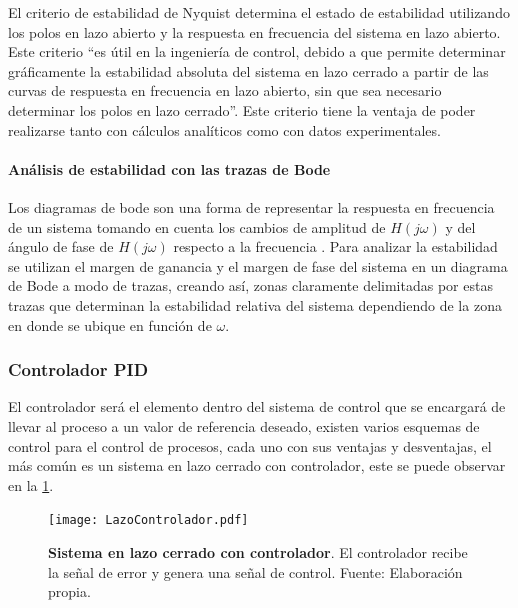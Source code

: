 				El criterio de estabilidad de Nyquist determina el estado de estabilidad utilizando los polos en lazo abierto y la respuesta en frecuencia del sistema en lazo abierto. Este criterio \enquote{es útil en la ingeniería de control, debido a que permite determinar gráficamente la estabilidad absoluta del sistema en lazo cerrado a partir de las curvas de respuesta en frecuencia en lazo abierto, sin que sea necesario determinar los polos en lazo cerrado}\Parencite[p.$\,$446]{ogata2003ingenieria}. Este criterio tiene la ventaja de poder realizarse tanto con cálculos analíticos como con datos experimentales.
			
			\paragraph{Análisis de estabilidad con las trazas de Bode}

				Los diagramas de bode son una forma de representar la respuesta en frecuencia de un sistema tomando en cuenta los cambios de amplitud de $H(j\omega)$ y del ángulo de fase de $H(j\omega)$ respecto a la frecuencia \Parencite{nilsson1995circuitos}. Para analizar la estabilidad se utilizan el margen de ganancia y el margen de fase del sistema en un diagrama de Bode a modo de trazas, creando así, zonas claramente delimitadas por estas trazas que determinan la estabilidad relativa del sistema dependiendo de la zona en donde se ubique en función de $\omega$.

		\subsubsection{Controlador PID}

			El controlador será el elemento dentro del sistema de control que se encargará de llevar al proceso a un valor de referencia deseado, existen varios esquemas de control para el control de procesos, cada uno con sus ventajas y desventajas, el más común es un sistema en lazo cerrado con controlador, este se puede observar en la \cref{fig:ControladorLazoCerrado}.

			\begin{figure}[htb]
				\centering
				\texttt{[image: LazoControlador.pdf]}
				\caption[Ejemplo de un sistema en lazo cerrado con controlador]{\textbf{Sistema en lazo cerrado con controlador}. El controlador recibe la señal de error y genera una señal de control. Fuente: Elaboración propia.} 
				\label{fig:ControladorLazoCerrado}
			\end{figure}
			
